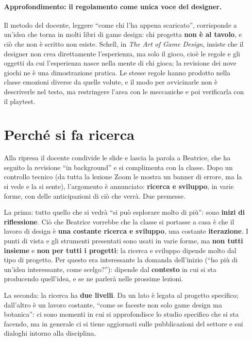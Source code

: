 \paragraph{Approfondimento: il regolamento come unica voce del designer.} Il metodo
del docente, leggere ``come chi l'ha appena scaricato'', corrisponde a un'idea che
torna in molti libri di game design: chi progetta \textbf{non è al tavolo}, e ciò che
non è scritto non esiste. Schell, in \emph{The Art of Game Design}, insiste che il
designer non crea direttamente l'esperienza, ma solo il gioco, cioè le regole e gli
oggetti da cui l'esperienza nasce nella mente di chi gioca; la revisione dei nove
giochi ne è una dimostrazione pratica. Le stesse regole hanno prodotto nella classe
emozioni diverse da quelle volute, e il modo per avvicinarle non è descriverle nel
testo, ma restringere l'area con le meccaniche e poi verificarla con il playtest.

\section{Perché si fa ricerca}
\label{a6:sec:perche}



Alla ripresa il docente condivide le slide e lascia la parola a Beatrice, che ha
seguito la revisione ``in background'' e si complimenta con la classe. Dopo un
controllo tecnico (da tutta la lezione Zoom le mostra un banner di errore, ma la si
vede e la si sente), l'argomento è annunciato: \textbf{ricerca e sviluppo}, in varie
forme, con delle anticipazioni di ciò che verrà. Due premesse.

La prima: tutto quello che si vedrà ``si può esplorare molto di più'': sono
\textbf{inizi di riflessione}. Ciò che Beatrice vorrebbe che la classe si portasse a
casa è che il lavoro di design è \textbf{una costante ricerca e sviluppo}, una
costante \textbf{iterazione}. I punti di vista e gli strumenti presentati sono usati
in varie forme, ma \textbf{non tutti insieme} e \textbf{non per tutti i progetti}:
la ricerca e sviluppo dipende molto dal tipo di progetto. Per questo era
interessante la domanda dell'inizio (``ho più di un'idea interessante, come
scelgo?''): dipende dal \textbf{contesto} in cui si sta producendo quell'idea, e se
ne parlerà nelle prossime lezioni.

La seconda: la ricerca ha \textbf{due livelli}. Da un lato è legata al progetto
specifico; dall'altro è un lavoro costante, ``come se faceste non solo game design ma
botanica'': ci sono momenti in cui si approfondisce lo studio specifico che si sta
facendo, ma in generale ci si tiene aggiornati sulle pubblicazioni del settore e sui
dialoghi intorno alla disciplina.

